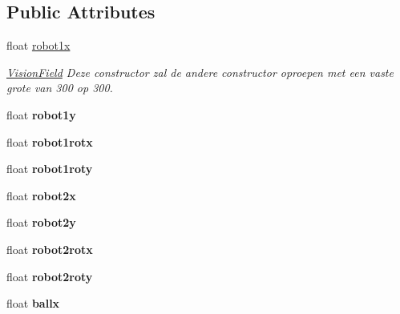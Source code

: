 \subsection*{Public Attributes}
\begin{DoxyCompactItemize}
\item 
float \hyperlink{class_vision_data_af98a9bee656ef6430673f408cee45da2}{robot1x}
\begin{DoxyCompactList}\small\item\em \hyperlink{class_vision_field}{Vision\-Field} Deze constructor zal de andere constructor oproepen met een vaste grote van 300 op 300. \end{DoxyCompactList}\item 
\hypertarget{class_vision_data_a702bbd27c633d02be24f76f32737243b}{float {\bfseries robot1y}}\label{class_vision_data_a702bbd27c633d02be24f76f32737243b}

\item 
\hypertarget{class_vision_data_a607a1a3998fb5c2e55132161376aee6d}{float {\bfseries robot1rotx}}\label{class_vision_data_a607a1a3998fb5c2e55132161376aee6d}

\item 
\hypertarget{class_vision_data_ac6251f1f565886167ceafa2a85bdcc20}{float {\bfseries robot1roty}}\label{class_vision_data_ac6251f1f565886167ceafa2a85bdcc20}

\item 
\hypertarget{class_vision_data_aed6c92e8c3206fd10db2a387b8e66f34}{float {\bfseries robot2x}}\label{class_vision_data_aed6c92e8c3206fd10db2a387b8e66f34}

\item 
\hypertarget{class_vision_data_a9aed5564ffd6e40fddc6cf3699f725c5}{float {\bfseries robot2y}}\label{class_vision_data_a9aed5564ffd6e40fddc6cf3699f725c5}

\item 
\hypertarget{class_vision_data_aa61ee7f362cf402d76679ca205fcf9c6}{float {\bfseries robot2rotx}}\label{class_vision_data_aa61ee7f362cf402d76679ca205fcf9c6}

\item 
\hypertarget{class_vision_data_a259eeaf986878c78bfed504a9f011059}{float {\bfseries robot2roty}}\label{class_vision_data_a259eeaf986878c78bfed504a9f011059}

\item 
\hypertarget{class_vision_data_ab4e13f61ff9f738c99d24cc94712890d}{float {\bfseries ballx}}\label{class_vision_data_ab4e13f61ff9f738c99d24cc94712890d}


\end{DoxyCompactItemize}
